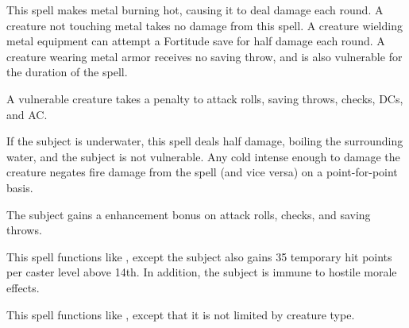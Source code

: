 \spellrng{\rngmed}
\begin{spelleffect}
  This spell makes metal burning hot, causing it to deal damage each round. A creature not touching metal takes no damage from this spell. A creature wielding metal equipment can attempt a Fortitude save for half damage each round. A creature wearing metal armor receives no saving throw, and is also vulnerable for the duration of the spell.
\end{spelleffect}
\begin{spellnotes}
A vulnerable creature takes a  penalty to attack rolls, saving throws, checks, DCs, and AC.

  If the subject is underwater, this spell deals half damage, boiling the surrounding water, and the subject is not vulnerable. Any cold intense enough to damage the creature negates fire damage from the spell (and vice versa) on a point-for-point basis.
\end{spellnotes}

\spellrng{\rngclose}
\begin{spelleffect}
  The subject gains a  enhancement bonus on attack rolls, checks, and saving throws. \bonusscalingdescription
\end{spelleffect}

\begin{spelleffect}
  This spell functions like , except the subject also gains 35 temporary hit points  per caster level above 14th. In addition, the subject is immune to hostile morale effects.
\end{spelleffect}

\begin{spelleffect}
  This spell functions like , except that it is not limited by creature type.
\end{spelleffect}

